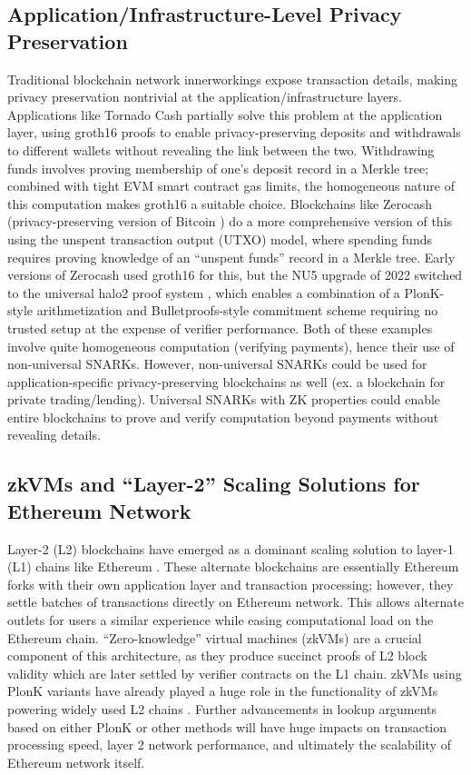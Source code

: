 \subsection{Application/Infrastructure-Level Privacy Preservation}
\noindent Traditional blockchain network innerworkings expose transaction details, making privacy preservation nontrivial at the application/infrastructure layers. Applications like Tornado Cash \cite{tornadocash} partially solve this problem at the application layer, using groth16 proofs to enable privacy-preserving deposits and withdrawals to different wallets without revealing the link between the two. Withdrawing funds involves proving membership of one's deposit record in a Merkle tree; combined with tight EVM smart contract gas limits, the homogeneous nature of this computation makes groth16 a suitable choice. Blockchains like Zerocash \cite{zcash} (privacy-preserving version of Bitcoin \cite{bitcoin}) do a more comprehensive version of this using the unspent transaction output (UTXO) model, where spending funds requires proving knowledge of an ``unspent funds'' record in a Merkle tree. Early versions of Zerocash used groth16 for this, but the NU5 upgrade of 2022 switched to the universal halo2 proof system \cite{halo2}, which enables a combination of a PlonK-style arithmetization and Bulletproofs-style commitment scheme \cite{bulletproofs} requiring no trusted setup at the expense of verifier performance. Both of these examples involve quite homogeneous computation (verifying payments), hence their use of non-universal SNARKs. However, non-universal SNARKs could be used for application-specific privacy-preserving blockchains as well (ex. a blockchain for private trading/lending). Universal SNARKs with ZK properties could enable entire blockchains to prove and verify computation beyond payments without revealing details. 

\subsection{zkVMs and ``Layer-2'' Scaling Solutions for Ethereum Network}
\noindent Layer-2 (L2) blockchains \cite{l2survey} have emerged as a dominant scaling solution to layer-1 (L1) chains like Ethereum \cite{ethereum}. These alternate blockchains are essentially Ethereum forks with their own application layer and transaction processing; however, they settle batches of transactions directly on Ethereum network. This allows alternate outlets for users a similar experience while easing computational load on the Ethereum chain. ``Zero-knowledge'' virtual machines (zkVMs) \cite{scrollzkevm, polygonzkevm, sp1, risc0, openvm} are a crucial component of this architecture, as they produce succinct proofs of L2 block validity which are later settled by verifier contracts on the L1 chain. zkVMs using PlonK variants \cite{scrollzkevm} have already played a huge role in the functionality of zkVMs powering widely used L2 chains \cite{scrollarch}. Further advancements in lookup arguments based on either PlonK or other methods will have huge impacts on transaction processing speed, layer 2 network performance, and ultimately the scalability of Ethereum network itself.  

